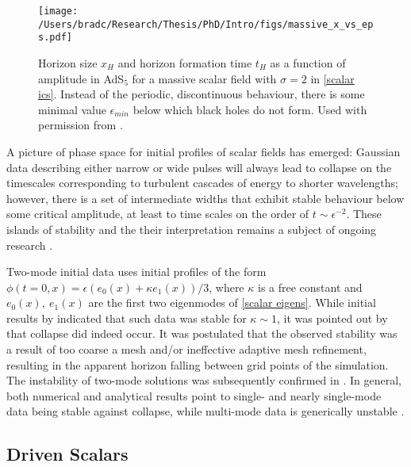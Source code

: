 \documentclass[../PhD.tex]{subfiles}
\begin{document}
\begin{figure}[h]
	\centering
	\texttt{[image: /Users/bradc/Research/Thesis/PhD/Intro/figs/massive\_x\_vs\_eps.pdf]}
	\caption[Horizon size and horizon formation time for a massive scalar]{Horizon size $x_H$ and horizon formation time $t_H$ as a function of amplitude in AdS$_5$ for a massive scalar field with $\sigma = 2$ in {\rm\eqref{scalar ics}}. Instead of the periodic, discontinuous behaviour, there is some minimal value $\epsilon_{min}$ below which black holes do not form. Used with permission from {\rm\cite{1508.02709}}.}
	\label{fig: massive x vs eps}
\end{figure}

A picture of phase space for initial profiles of scalar fields has emerged: Gaussian data describing either narrow or wide pulses will always lead to collapse on the timescales corresponding to turbulent cascades of energy to shorter wavelengths; however, there is a set of intermediate widths that exhibit stable behaviour below some critical amplitude, at least to time scales on the order of $t \sim \epsilon^{-2}$. These islands of stability and the their interpretation remains a subject of ongoing research \cite{1507.08261, TTF, 1706.07413, 1803.02830, 1912.07143}.

Two-mode initial data uses initial profiles of the form $\phi(t=0,x) = \epsilon ( e_0 (x) + \kappa e_1 (x) )/3$, where $\kappa$ is a free constant and $e_0(x), \: e_1(x)$ are the first two eigenmodes of \eqref{scalar eigens}. While initial results by \cite{1403.6471} indicated that such data was stable for $\kappa \sim 1$, it was pointed out by \cite{1410.2631} that  collapse did indeed occur. It was postulated that the observed stability was a result of too coarse a mesh and/or ineffective adaptive mesh refinement, resulting in the apparent horizon falling between grid points of the simulation. The instability of two-mode solutions was subsequently confirmed in \cite{1508.02709}. In general, both numerical and analytical results point to single- and nearly single-mode data being stable against collapse, while multi-mode data is generically unstable \cite{1311.7409, 1211.7076, 1512.00349, 1509.00232, 1512.04383, 1504.05203, 1904.02168}.


\subsection{Driven Scalars}
\end{document}
